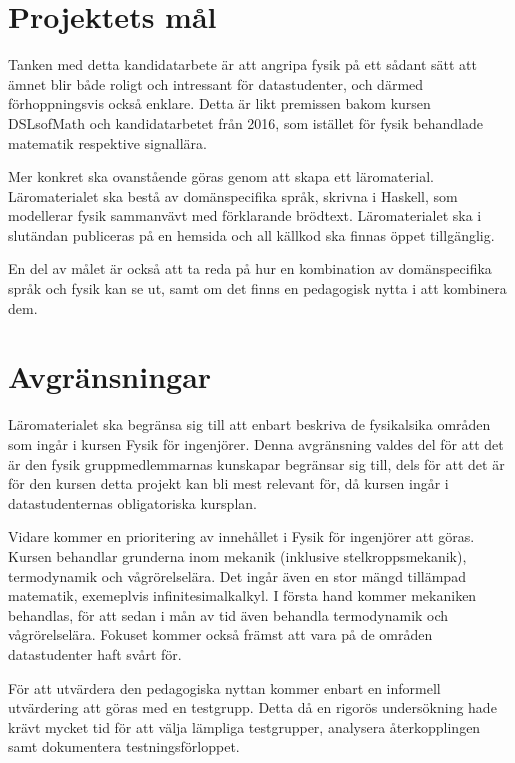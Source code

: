 % 

\section{Projektets mål}

\begin{draft}

Tanken med detta kandidatarbete är att angripa fysik på ett sådant sätt att ämnet blir både roligt och intressant för datastudenter, och därmed förhoppningsvis också enklare. Detta är likt premissen bakom kursen DSLsofMath och kandidatarbetet från 2016, som istället för fysik behandlade matematik respektive signallära.

Mer konkret ska ovanstående göras genom att skapa ett läromaterial. Läromaterialet ska bestå av domänspecifika språk, skrivna i Haskell, som modellerar fysik sammanvävt med förklarande brödtext. Läromaterialet ska i slutändan publiceras på en hemsida och all källkod ska finnas öppet tillgänglig.

En del av målet är också att ta reda på hur en kombination av domänspecifika språk och fysik kan se ut, samt om det finns en pedagogisk nytta i att kombinera dem.

\end{draft}

\section{Avgränsningar}

\begin{draft}

Läromaterialet ska begränsa sig till att enbart beskriva de fysikalsika områden som ingår i kursen Fysik för ingenjörer. Denna avgränsning valdes del för att det är den fysik gruppmedlemmarnas kunskapar begränsar sig till, dels för att det är för den kursen detta projekt kan bli mest relevant för, då kursen ingår i datastudenternas obligatoriska kursplan.

Vidare kommer en prioritering av innehållet i Fysik för ingenjörer att göras. Kursen behandlar grunderna inom mekanik (inklusive stelkroppsmekanik), termodynamik och vågrörelselära. Det ingår även en stor mängd tillämpad matematik, exemeplvis infinitesimalkalkyl. I första hand kommer mekaniken behandlas, för att sedan i mån av tid även behandla termodynamik och vågrörelselära. Fokuset kommer också främst att vara på de områden datastudenter haft svårt för.

För att utvärdera den pedagogiska nyttan kommer enbart en informell utvärdering att göras med en testgrupp. Detta då en rigorös undersökning hade krävt mycket tid för att välja lämpliga testgrupper, analysera återkopplingen samt dokumentera testningsförloppet.

\end{draft}

